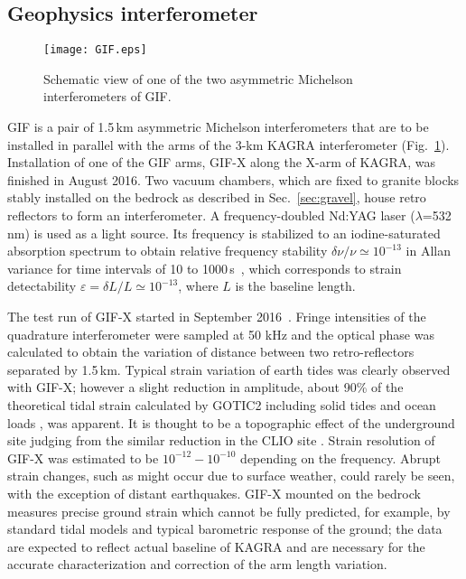 \documentclass[prd ,twocolumn ,secnumarabic,dvips
,amssymb, amsmath,nobibnotes, aps, prd,superscriptaddress]{revtex4-1}
\begin{document}
{\subsection{Geophysics interferometer}\label{sec:GIF}
%
\begin{figure}[htbp]
\centering
		\texttt{[image: GIF.eps]}
		\caption{\label{fig:GIF}Schematic view of one of the two asymmetric Michelson interferometers of GIF.}
\end{figure}
GIF is a pair of 1.5\,km asymmetric Michelson interferometers that are to be installed in parallel with the arms of the 3-km KAGRA interferometer (Fig.~\ref{fig:GIF}). Installation of one of the GIF arms, GIF-X along the X-arm of 
KAGRA, was finished in August 2016. Two vacuum chambers, which are fixed to granite 
blocks stably installed on the bedrock as described in Sec.~\ref{sec:gravel}, house retro reflectors to 
form an interferometer. A frequency-doubled Nd:YAG laser ($\lambda$=532\,nm) is used 
as a light source. Its frequency is stabilized to an iodine-saturated absorption spectrum 
to obtain relative frequency stability $\delta\nu/\nu\simeq10^{-13}$ in Allan variance for time intervals of 10 to 1000\,s~\cite{araya1}, which corresponds 
to strain detectability $\varepsilon=\delta L/L\simeq 10^{-13}$, where $L$ is the baseline length.

The test run of GIF-X started in September 2016~\cite{GIF2017}. Fringe intensities of the quadrature interferometer 
were sampled at 50 kHz and the optical phase was calculated to obtain the variation of distance between 
two retro-reflectors separated by 1.5\,km. Typical strain variation of earth tides was clearly 
observed with GIF-X; however a slight reduction in amplitude, about 90\% of the theoretical tidal strain 
calculated by GOTIC2 including solid tides and ocean loads \cite{araya2}, was apparent. It is thought to be a 
topographic effect of the underground site judging from the similar reduction in the CLIO site \cite{araya3, araya4}. 
Strain resolution of GIF-X was estimated to be $10^{-12}- 10^{-10}$ depending on the frequency. 
Abrupt strain changes, such as might occur due to surface weather, could rarely be seen, with the exception of distant earthquakes. GIF-X mounted on the bedrock measures precise ground strain which cannot be fully predicted, for example, by standard tidal models and typical barometric response of the ground; the data are expected to reflect actual baseline of KAGRA and are necessary for the accurate characterization and correction of the arm length variation.

}
\end{document}

